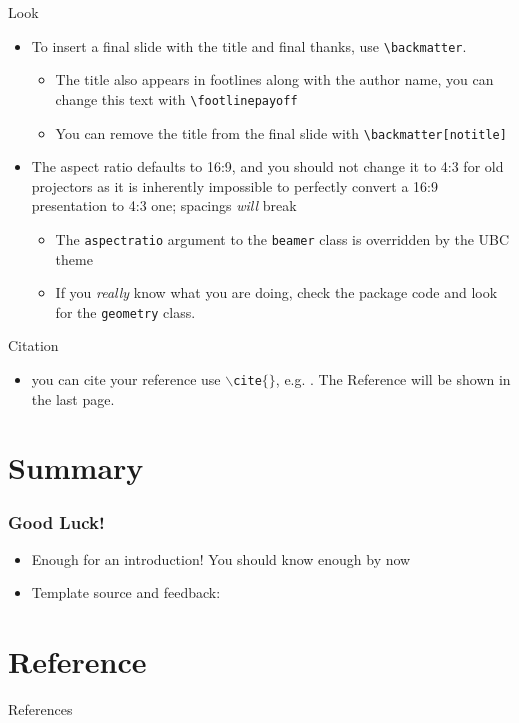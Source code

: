 \begin{frame}[fragile]{Look}
\begin{itemize}
\item To insert a final slide with the title and final thanks, use \verb|\backmatter|.
      \begin{itemize}
      \item The title also appears in footlines along with the author name, you can change this text with \verb|\footlinepayoff|
      \item You can remove the title from the final slide with \verb|\backmatter[notitle]|
      \end{itemize}
\item The aspect ratio defaults to 16:9, and you should not change it to 4:3
      for old projectors as it is inherently impossible to perfectly convert a 
      16:9 presentation to 4:3 one; spacings \emph{will} break
      \begin{itemize}
      \item The \texttt{aspectratio} argument to the \texttt{beamer} class is
            overridden by the UBC theme
      \item If you \emph{really} know what you are doing, check the package
            code and look for the \texttt{geometry} class.
      \end{itemize}
\end{itemize}
\end{frame}

\begin{frame}{Citation}
\begin{itemize}
\item you can cite your reference use \texttt{$\backslash$cite$\{\}$}, e.g. \cite{bagla2005cosmological}. The Reference will be shown in the last page.
\end{itemize}
\end{frame}

\section{Summary}

\begin{frame}
\frametitle{Good Luck!}
\begin{itemize}
\item Enough for an introduction! You should know enough by now
\item Template source and feedback:
\end{itemize}
\end{frame}

\section{Reference}

\makeatletter
\renewcommand{\@biblabel}[1]{[\number\numexpr\value{enumiv}+1\relax]}
\makeatother

\begin{frame}[allowframebreaks]{References}
\tiny
{}


\end{frame}
